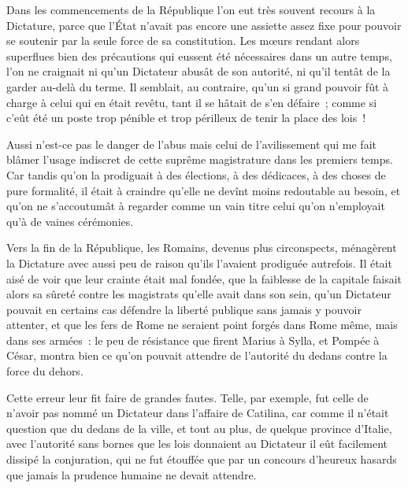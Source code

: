 \documentclass[french,twoside]{book} %
\begin{document}
Dans les commencements de la République l’on eut très souvent recours à la Dictature, parce que l’État n’avait pas encore une assiette assez fixe pour pouvoir se soutenir par la seule force de sa constitution. Les mœurs rendant alors superflues bien des précautions qui eussent été nécessaires dans un autre temps, l’on ne craignait ni qu’un Dictateur abusât de son autorité, ni qu’il tentât de la garder au-delà du terme. Il semblait, au contraire, qu’un si grand pouvoir fût à charge à celui qui en était revêtu, tant il se hâtait de s’en défaire ; comme si c’eût été un poste trop pénible et trop périlleux de tenir la place des lois !\par
Aussi n’est-ce pas le danger de l’abus mais celui de l’avilissement qui me fait blâmer l’usage indiscret de cette suprême magistrature dans les premiers temps. Car tandis qu’on la prodiguait à des élections, à des dédicaces, à des choses de pure formalité, il était à craindre qu’elle ne devînt moins redoutable au besoin, et qu’on ne s’accoutumât à regarder comme un vain titre celui qu’on n’employait qu’à de vaines cérémonies.\par
Vers la fin de la République, les Romains, devenus plus circonspects, ménagèrent la Dictature avec aussi peu de raison qu’ils l’avaient prodiguée autrefois. Il était aisé de voir que leur crainte était mal fondée, que la faiblesse de la capitale faisait alors sa sûreté contre les magistrats qu’elle avait dans son sein, qu’un Dictateur pouvait en certains cas défendre la liberté publique sans jamais y pouvoir attenter, et que les fers de Rome ne seraient point forgés dans Rome même, mais dans ses armées : le peu de résistance que firent Marius à Sylla, et Pompée à César, montra bien ce qu’on pouvait attendre de l’autorité du dedans contre la force du dehors.\par
Cette erreur leur fit faire de grandes fautes. Telle, par exemple, fut celle de n’avoir pas nommé un Dictateur dans l’affaire de Catilina, car comme il n’était question que du dedans de la ville, et tout au plus, de quelque province d’Italie, avec l’autorité sans bornes que les lois donnaient au Dictateur il eût facilement dissipé la conjuration, qui ne fut étouffée que par un concours d’heureux hasards que jamais la prudence humaine ne devait attendre.\par
\end{document}
